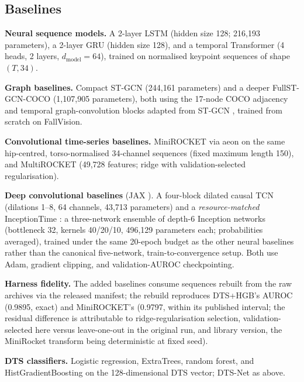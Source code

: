 \subsection{Baselines}
\textbf{Neural sequence models.} A 2-layer LSTM (hidden size 128; 216,193 parameters), a 2-layer GRU (hidden size 128), and a temporal Transformer (4 heads, 2 layers, $d_{\mathrm{model}}=64$), trained on normalised keypoint sequences of shape $(T,34)$.

\textbf{Graph baselines.} Compact ST-GCN (244,161 parameters) and a deeper FullST-GCN-COCO (1,107,905 parameters), both using the 17-node COCO adjacency and temporal graph-convolution blocks adapted from ST-GCN \citep{yan2018stgcn}, trained from scratch on FallVision.

\textbf{Convolutional time-series baselines.} MiniROCKET \citep{dempster2021minirocket} via aeon \citep{middlehurst2024aeon} on the same hip-centred, torso-normalised 34-channel sequences (fixed maximum length 150), and MultiROCKET \citep{tan2022multirocket} (49,728 features; ridge with validation-selected regularisation).

\textbf{Deep convolutional baselines} (JAX \citep{jax2018}). A four-block dilated causal TCN \citep{bai2018tcn} (dilations 1--8, 64 channels, 43,713 parameters) and a \emph{resource-matched} InceptionTime \citep{fawaz2020inceptiontime}: a three-network ensemble of depth-6 Inception networks (bottleneck 32, kernels 40/20/10, 496,129 parameters each; probabilities averaged), trained under the same 20-epoch budget as the other neural baselines rather than the canonical five-network, train-to-convergence setup. Both use Adam, gradient clipping, and validation-AUROC checkpointing.

\textbf{Harness fidelity.} The added baselines consume sequences rebuilt from the raw archives via the released manifest; the rebuild reproduces DTS+HGB's AUROC (0.9895, exact) and MiniROCKET's (0.9797, within its published interval; the residual difference is attributable to ridge-regularisation selection, validation-selected here versus leave-one-out in the original run, and library version, the MiniRocket transform being deterministic at fixed seed).

\textbf{DTS classifiers.} Logistic regression, ExtraTrees, random forest, and HistGradientBoosting on the 128-dimensional DTS vector; DTS-Net as above.


